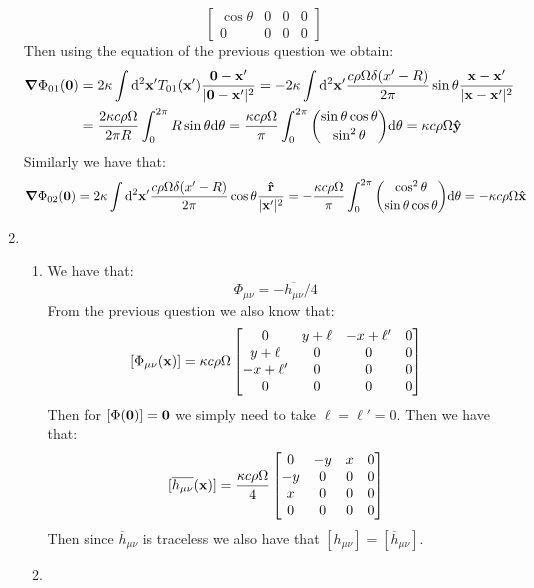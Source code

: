\documentclass[10pt,a4paper]{article}
\begin{document}
\begin{enumerate}
\[\begin{bmatrix}
\cos\theta & 0 & 0 & 0\\
0 & 0 &0 &0 
\end{bmatrix}
\]
Then using the equation of the previous question we obtain:
\begin{align*}
\grad \Phi_{0 1}(\vb{0}) &= 2 \kappa \int \dd^2 \vb{x'} T_{0 1}(\vb{x'}) \frac{\vb{0} - \vb{x'}}{|\vb{0} - \vb{x'}|^2} = -2 \kappa \int \dd^2 \vb{x'} \frac{c \rho \Omega \delta(x' - R)}{2 \pi} \sin \theta \frac{\vb{x} - \vb{x'}}{|\vb{x} - \vb{x'}|^2}\\
&= \frac{2 \kappa c \rho \Omega}{2\pi R} \int_0^{2\pi} R \sin \theta \dd \theta = \frac{\kappa c \rho \Omega}{\pi} \int_0^{2\pi} \binom{\sin \theta \cos \theta}{\sin^2\theta} \dd \theta = \kappa c \rho \Omega \vu{y}
\end{align*}
Similarly we have that:
\begin{align*}
\grad \Phi_{02}(\vb{0}) = 2 \kappa \int \dd^2 \vb{x'} \frac{c \rho \Omega \delta(x' - R)}{2 \pi} \cos \theta \frac{\vu{r}}{|\vb{x'}|^2}= -\frac{\kappa c \rho \Omega}{\pi} \int_{0}^{2\pi} \binom{\cos^2\theta}{\sin\theta\cos\theta} \dd \theta = - \kappa c \rho \Omega \vu{x}
\end{align*}

\item \begin{enumerate}

\item We have that:
\[
\Phi_{\mu\nu} = - \overline{h_{\mu\nu}}/4 
\]
From the previous question we also know that:
\[
[\Phi_{\mu\nu}(\vb{x})] = \kappa c \rho \Omega \begin{bmatrix}
0 & y + \ell & - x + \ell' & 0\\
y + \ell & 0 & 0 & 0\\
-x + \ell' & 0 & 0 & 0\\
0 & 0 & 0 & 0
\end{bmatrix}
\]
Then for $[\Phi(\vb{0})] = \vb{0}$ we simply need to take $\ell = \ell' = 0$. Then we have that:
\[
[\overline{h_{\mu\nu}}(\vb{x})] = \frac{\kappa c \rho \Omega}{4} \begin{bmatrix}
0 & - y & x & 0\\
-y & 0 & 0 & 0\\
x & 0 & 0& 0\\
0& 0 & 0& 0
\end{bmatrix}
\]
Then since $\overline{h}_{\mu\nu}$ is traceless we also have that $[h_{\mu\nu}] = [\overline{h}_{\mu\nu}]$. 

\item 

\end{enumerate}

\end{enumerate}
\end{document}
